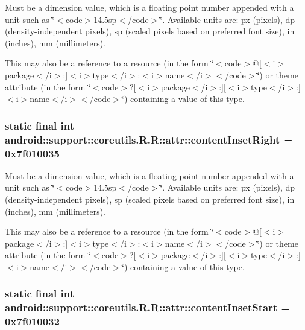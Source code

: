 Must be a dimension value, which is a floating point number appended with a unit such as \char`\"{}$<$code$>$14.5sp$<$/code$>$\char`\"{}. Available units are: px (pixels), dp (density-independent pixels), sp (scaled pixels based on preferred font size), in (inches), mm (millimeters). 

This may also be a reference to a resource (in the form \char`\"{}$<$code$>$@\mbox{[}$<$i$>$package$<$/i$>$:\mbox{]}$<$i$>$type$<$/i$>$:$<$i$>$name$<$/i$>$$<$/code$>$\char`\"{}) or theme attribute (in the form \char`\"{}$<$code$>$?\mbox{[}$<$i$>$package$<$/i$>$:\mbox{]}\mbox{[}$<$i$>$type$<$/i$>$:\mbox{]}$<$i$>$name$<$/i$>$$<$/code$>$\char`\"{}) containing a value of this type. \hypertarget{classandroid_1_1support_1_1coreutils_1_1_r_1_1attr_269450ae0c06eeecb84f99aab9b5a8dc}{
\subsubsection[{contentInsetRight}]{\setlength{\rightskip}{0pt plus 5cm}static final int android::support::coreutils.R.R::attr::contentInsetRight = 0x7f010035}}
\label{classandroid_1_1support_1_1coreutils_1_1_r_1_1attr_269450ae0c06eeecb84f99aab9b5a8dc}


Must be a dimension value, which is a floating point number appended with a unit such as \char`\"{}$<$code$>$14.5sp$<$/code$>$\char`\"{}. Available units are: px (pixels), dp (density-independent pixels), sp (scaled pixels based on preferred font size), in (inches), mm (millimeters). 

This may also be a reference to a resource (in the form \char`\"{}$<$code$>$@\mbox{[}$<$i$>$package$<$/i$>$:\mbox{]}$<$i$>$type$<$/i$>$:$<$i$>$name$<$/i$>$$<$/code$>$\char`\"{}) or theme attribute (in the form \char`\"{}$<$code$>$?\mbox{[}$<$i$>$package$<$/i$>$:\mbox{]}\mbox{[}$<$i$>$type$<$/i$>$:\mbox{]}$<$i$>$name$<$/i$>$$<$/code$>$\char`\"{}) containing a value of this type. \hypertarget{classandroid_1_1support_1_1coreutils_1_1_r_1_1attr_7b137908877ccb0baea34419048db459}{
\subsubsection[{contentInsetStart}]{\setlength{\rightskip}{0pt plus 5cm}static final int android::support::coreutils.R.R::attr::contentInsetStart = 0x7f010032}}
\label{classandroid_1_1support_1_1coreutils_1_1_r_1_1attr_7b137908877ccb0baea34419048db459}


